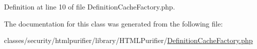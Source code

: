 Definition at line 10 of file Definition\+Cache\+Factory.\+php.



The documentation for this class was generated from the following file\+:\begin{DoxyCompactItemize}
\item 
classes/security/htmlpurifier/library/\+H\+T\+M\+L\+Purifier/\hyperlink{DefinitionCacheFactory_8php}{Definition\+Cache\+Factory.\+php}\end{DoxyCompactItemize}
